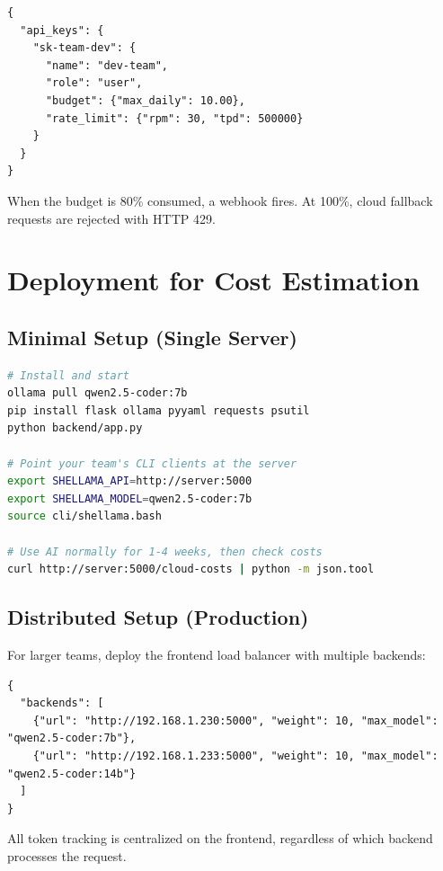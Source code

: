 \documentclass[11pt,a4paper]{article}
\begin{document}
\begin{lstlisting}[language={},caption={API key with budget limit}]
{
  "api_keys": {
    "sk-team-dev": {
      "name": "dev-team",
      "role": "user",
      "budget": {"max_daily": 10.00},
      "rate_limit": {"rpm": 30, "tpd": 500000}
    }
  }
}
\end{lstlisting}

When the budget is 80\% consumed, a webhook fires. At 100\%, cloud fallback requests are rejected with HTTP 429.

\section{Deployment for Cost Estimation}

\subsection{Minimal Setup (Single Server)}

\begin{lstlisting}[language=bash,caption={Quick start for cost estimation}]
# Install and start
ollama pull qwen2.5-coder:7b
pip install flask ollama pyyaml requests psutil
python backend/app.py

# Point your team's CLI clients at the server
export SHELLAMA_API=http://server:5000
export SHELLAMA_MODEL=qwen2.5-coder:7b
source cli/shellama.bash

# Use AI normally for 1-4 weeks, then check costs
curl http://server:5000/cloud-costs | python -m json.tool
\end{lstlisting}

\subsection{Distributed Setup (Production)}

For larger teams, deploy the frontend load balancer with multiple backends:

\begin{lstlisting}[language={},caption={backends.json for multi-server deployment}]
{
  "backends": [
    {"url": "http://192.168.1.230:5000", "weight": 10, "max_model": "qwen2.5-coder:7b"},
    {"url": "http://192.168.1.233:5000", "weight": 10, "max_model": "qwen2.5-coder:14b"}
  ]
}
\end{lstlisting}

All token tracking is centralized on the frontend, regardless of which backend processes the request.
\end{document}
